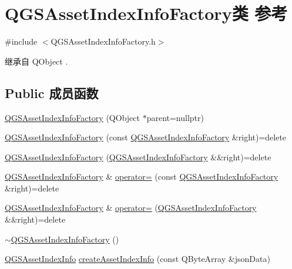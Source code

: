 \hypertarget{class_q_g_s_asset_index_info_factory}{}\section{Q\+G\+S\+Asset\+Index\+Info\+Factory类 参考}
\label{class_q_g_s_asset_index_info_factory}


{\ttfamily \#include $<$Q\+G\+S\+Asset\+Index\+Info\+Factory.\+h$>$}



继承自 Q\+Object .

\subsection*{Public 成员函数}
\begin{DoxyCompactItemize}
\item 
\mbox{\hyperlink{class_q_g_s_asset_index_info_factory_a1738a463af4b79c5eab8424649b0ca66}{Q\+G\+S\+Asset\+Index\+Info\+Factory}} (Q\+Object $\ast$parent=nullptr)
\item 
\mbox{\hyperlink{class_q_g_s_asset_index_info_factory_a2a34b9b9e5aee9272145a57c93080c87}{Q\+G\+S\+Asset\+Index\+Info\+Factory}} (const \mbox{\hyperlink{class_q_g_s_asset_index_info_factory}{Q\+G\+S\+Asset\+Index\+Info\+Factory}} \&right)=delete
\item 
\mbox{\hyperlink{class_q_g_s_asset_index_info_factory_a059a9f85091944ef3c6ea73256ce1bd2}{Q\+G\+S\+Asset\+Index\+Info\+Factory}} (\mbox{\hyperlink{class_q_g_s_asset_index_info_factory}{Q\+G\+S\+Asset\+Index\+Info\+Factory}} \&\&right)=delete
\item 
\mbox{\hyperlink{class_q_g_s_asset_index_info_factory}{Q\+G\+S\+Asset\+Index\+Info\+Factory}} \& \mbox{\hyperlink{class_q_g_s_asset_index_info_factory_a46220fce38e2349177270ebc845d3dd5}{operator=}} (const \mbox{\hyperlink{class_q_g_s_asset_index_info_factory}{Q\+G\+S\+Asset\+Index\+Info\+Factory}} \&right)=delete
\item 
\mbox{\hyperlink{class_q_g_s_asset_index_info_factory}{Q\+G\+S\+Asset\+Index\+Info\+Factory}} \& \mbox{\hyperlink{class_q_g_s_asset_index_info_factory_a428b83daaad41f6806b68e28540965ad}{operator=}} (\mbox{\hyperlink{class_q_g_s_asset_index_info_factory}{Q\+G\+S\+Asset\+Index\+Info\+Factory}} \&\&right)=delete
\item 
\mbox{\hyperlink{class_q_g_s_asset_index_info_factory_a76309e98a65bea27d49f99ec266d3584}{$\sim$\+Q\+G\+S\+Asset\+Index\+Info\+Factory}} ()
\item 
\mbox{\hyperlink{class_q_g_s_asset_index_info}{Q\+G\+S\+Asset\+Index\+Info}} \mbox{\hyperlink{class_q_g_s_asset_index_info_factory_a672775b74375280b5358fa19ce9ebac3}{create\+Asset\+Index\+Info}} (const Q\+Byte\+Array \&json\+Data)
\end{DoxyCompactItemize}


